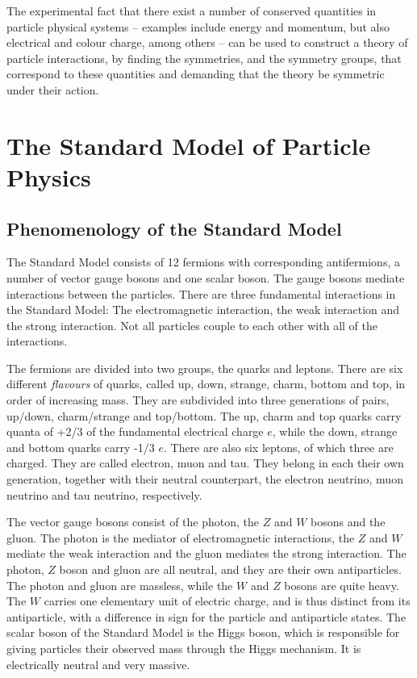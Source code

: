 The experimental fact that there exist a number of conserved quantities in particle physical systems -- examples include energy and momentum, but also electrical and colour charge, among others -- can be used to construct a theory of particle interactions, by finding the symmetries, and the symmetry groups, that correspond to these quantities and demanding that the theory be symmetric under their action.

\section{The Standard Model of Particle Physics}

\subsection{Phenomenology of the Standard Model}
The Standard Model consists of 12 fermions with corresponding antifermions, a number of vector gauge bosons and one scalar boson. The gauge bosons mediate interactions between the particles. There are three fundamental interactions in the Standard Model: The electromagnetic interaction, the weak interaction and the strong interaction. Not all particles couple to each other with all of the interactions. 

The fermions are divided into two groups, the quarks and leptons. There are six different {\it flavours} of quarks, called up, down, strange, charm, bottom and top, in order of increasing mass. They are subdivided into three generations of pairs, up/down, charm/strange and top/bottom. The up, charm and top quarks carry quanta of +2/3 of the fundamental electrical charge $e$, while the down, strange and bottom quarks carry -1/3 $e$. There are also six leptons, of which three are charged. They are called electron, muon and tau. They belong in each their own generation, together with their neutral counterpart, the electron neutrino, muon neutrino and tau neutrino, respectively. 

The vector gauge bosons consist of the photon, the $Z$ and $W$ bosons and the gluon. The photon is the mediator of electromagnetic interactions, the $Z$ and $W$ mediate the weak interaction and the gluon mediates the strong interaction. The photon, $Z$ boson and gluon are all neutral, and they are their own antiparticles. The photon and gluon are massless, while the $W$ and $Z$ bosons are quite heavy. The $W$ carries one elementary unit of electric charge, and is thus distinct from its antiparticle, with a difference in sign for the particle and antiparticle states. The scalar boson of the Standard Model is the Higgs boson, which is responsible for giving particles their observed mass through the Higgs mechanism. It is electrically neutral and very massive.

